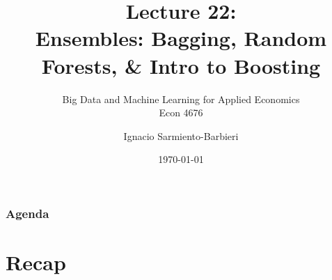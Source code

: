 \documentclass[
  shownotes,
  xcolor={svgnames},
  hyperref={colorlinks,citecolor=DarkBlue,linkcolor=DarkRed,urlcolor=DarkBlue}
  , aspectratio=169]{beamer}
\begin{document}
 
\title[Lecture 22]{Lecture 22: \\ Ensembles: Bagging, Random Forests, \& Intro to Boosting}
\subtitle{Big Data and Machine Learning for Applied Economics \\ Econ 4676}
\date{\today}

\author[Sarmiento-Barbieri]{Ignacio Sarmiento-Barbieri}


\begin{frame}[noframenumbering]
\maketitle
\end{frame}






\begin{frame}
\frametitle{Agenda}

\tableofcontents

\end{frame}
\section{Recap}
\end{document}
